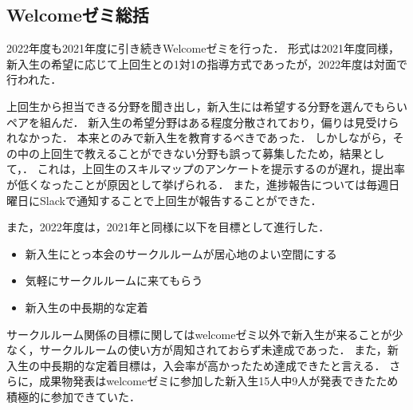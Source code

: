 \subsection*{Welcomeゼミ総括}


2022年度も2021年度に引き続きWelcomeゼミを行った．
形式は2021年度同様，新入生の希望に応じて上回生との1対1の指導方式であったが，2022年度は対面で行われた．

上回生から担当できる分野を聞き出し，新入生には希望する分野を選んでもらいペアを組んだ．
新入生の希望分野はある程度分散されており，偏りは見受けられなかった．
本来\secondGrade{}と\thirdGrade{}のみで新入生を教育するべきであった．
しかしながら，その中の上回生で教えることができない分野も誤って募集したため，結果として，．
これは，上回生のスキルマップのアンケートを提示するのが遅れ，提出率が低くなったことが原因として挙げられる．
また，進捗報告については毎週日曜日にSlackで通知することで上回生が報告することができた．

また，2022年度は，2021年と同様に以下を目標として進行した．
\begin{itemize}
	\item 新入生にとっ本会のサークルルームが居心地のよい空間にする
	\item 気軽にサークルルームに来てもらう
	\item 新入生の中長期的な定着
\end{itemize}

サークルルーム関係の目標に関してはwelcomeゼミ以外で新入生が来ることが少なく，サークルルームの使い方が周知されておらず未達成であった．
また，新入生の中長期的な定着目標は，入会率が高かったため達成できたと言える．
さらに，成果物発表はwelcomeゼミに参加した新入生15人中9人が発表できたため積極的に参加できていた．
